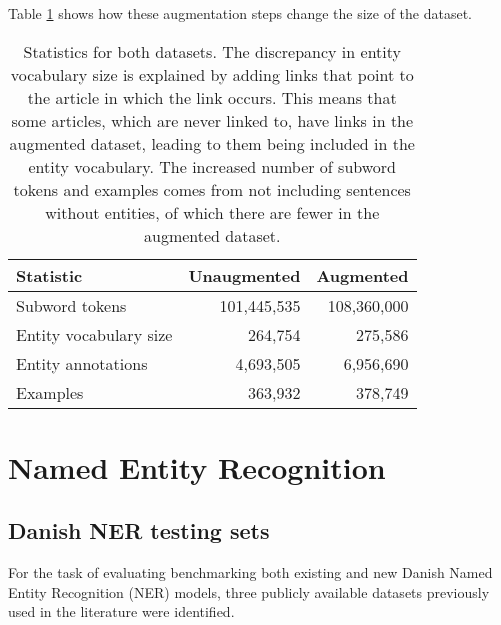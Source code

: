 \documentclass[main.tex]{subfiles}
\begin{document}
Table \ref{tab:metadata} shows how these augmentation steps change the size of the dataset.
\begin{table}[H]
    \centering
    \begin{tabular}{l|r|r}
        Statistic&Unaugmented	&Augmented	\\\hline
        Subword tokens&101,445,535	&108,360,000	\\
        Entity vocabulary size&264,754  &275,586\\
        Entity annotations&4,693,505	&6,956,690\\
        Examples&363,932   &378,749
    \end{tabular}
    \caption{
        Statistics for both datasets.
        The discrepancy in entity vocabulary size is explained by adding links that point to the article in which the link occurs.
        This means that some articles, which are never linked to, have links in the augmented dataset, leading to them being included in the entity vocabulary.
        The increased number of subword tokens and examples comes from not including sentences without entities, of which there are fewer in the augmented dataset.
    }
    \label{tab:metadata}
\end{table}\noindent


\section{Named Entity Recognition}
\label{sec:nerdata}

\subsection{Danish NER testing sets}
\label{subsec:daNERdata}
For the task of evaluating benchmarking both existing and new Danish Named Entity Recognition (NER) models, three publicly available datasets previously used in the literature were identified.
\end{document}
